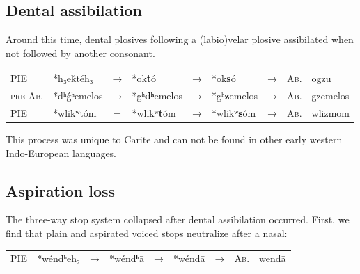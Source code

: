 \documentclass[svgnames,x11names,b5paper]{book}
\begin{document}
            \subsection{Dental assibilation}
        
        Around this time, dental plosives following a (labio)velar plosive assibilated when not followed by another consonant.

            \begin{table}[H]
                \begin{center}
                \begin{tabular}{llcllllll}
                \textsc{PIE} & *h₃eḱtéh₃ & → & *ok\textbf{t}ṓ & → & *ok\textbf{s}ṓ & → & \textsc{Ab.} & ogzū\\
                \textsc{pre-Ab.} & *dʰǵʰemelos & → & *gʰ\textbf{dʰ}emelos & → & *gʰ\textbf{z}emelos & → & \textsc{Ab.} & gzemelos\\
                \textsc{PIE} & *wlikʷtóm & = & *wlikʷ\textbf{t}óm & → & *wlikʷ\textbf{s}óm & → & \textsc{Ab.} & wlizmom\\
                \end{tabular}
                \end{center}
                \end{table}
        
            This process was unique to Carite and can not be found in other early western Indo-European languages.

            \subsection{Aspiration loss}
        
        The three-way stop system collapsed after dental assibilation occurred. First, we find that plain and aspirated voiced stops neutralize after a nasal:

            \begin{table}[H]
                \begin{center}
                \begin{tabular}{llcllllll}
                \textsc{PIE} & *wéndʰeh₂ & → & *wénd\textbf{ʰ}ā & → & *wéndā & → & \textsc{Ab.} & wendā\\
                \end{tabular}
                \end{center}
                \end{table}
        
\end{document}
